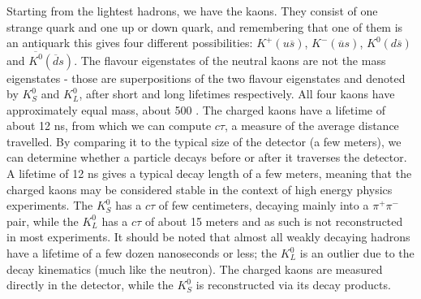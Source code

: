       Starting from the lightest hadrons, we have the kaons. They consist of one strange quark and one up or down quark, and remembering that one of them is an antiquark this gives four different possibilities: $K^+ (u\overline{s})$, $K^- (\overline{u}s)$, $K^0 (d\overline{s})$ and $\overline{K^0} (\overline{d}s)$. The flavour eigenstates of the neutral kaons are not the mass eigenstates - those are superpositions of the two flavour eigenstates and denoted by $K^0_S$ and $K_L^0$, after short and long lifetimes respectively. All four kaons have approximately equal mass, about 500 \mev. 
      The charged kaons have a lifetime of about 12 ns, from which we can compute $c\tau$, a measure of the average distance travelled. By comparing it to the typical size of the detector (a few meters), we can determine whether a particle decays before or after it traverses the detector. A lifetime of 12 ns gives a typical decay length of a few meters, meaning that the charged kaons may be considered stable in the context of high energy physics experiments. The $K^0_S$ has a $c\tau$ of few centimeters, decaying mainly into a $\pi^+\pi^-$ pair, while the $K_L^0$ has a $c\tau$ of about 15 meters  and as such is not reconstructed in most experiments. It should be noted that almost all weakly decaying hadrons have a lifetime of a few dozen nanoseconds or less; the $K^0_L$ is an outlier due to the decay kinematics (much like the neutron). The charged kaons are measured directly in the detector, while the $K^0_S$ is reconstructed via its decay products. 
      
